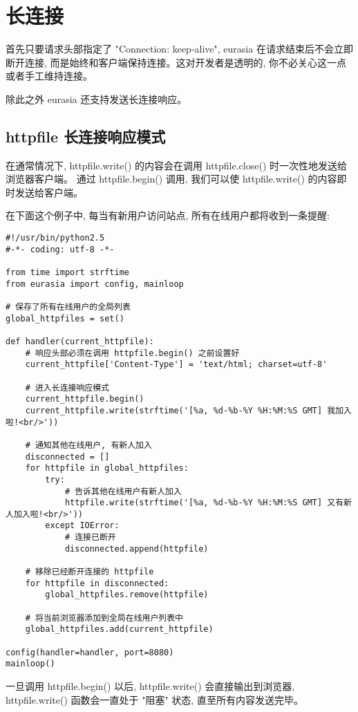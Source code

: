 \documentclass{manual}
\begin{document}
\section{长连接}

首先只要请求头部指定了 "Connection: keep-alive", eurasia 在请求结束后不会立即断开连接,
而是始终和客户端保持连接。这对开发者是透明的, 你不必关心这一点或者手工维持连接。

除此之外 eurasia 还支持发送长连接响应。

\subsection{httpfile 长连接响应模式}

在通常情况下, httpfile.write() 的内容会在调用 httpfile.close() 时一次性地发送给浏览器客户端。
通过 httpfile.begin() 调用, 我们可以使 httpfile.write() 的内容即时发送给客户端。

在下面这个例子中, 每当有新用户访问站点, 所有在线用户都将收到一条提醒:

\begin{verbatim}
#!/usr/bin/python2.5
#-*- coding: utf-8 -*-

from time import strftime
from eurasia import config, mainloop

# 保存了所有在线用户的全局列表
global_httpfiles = set()

def handler(current_httpfile):
	# 响应头部必须在调用 httpfile.begin() 之前设置好
	current_httpfile['Content-Type'] = 'text/html; charset=utf-8'

	# 进入长连接响应模式
	current_httpfile.begin()
	current_httpfile.write(strftime('[%a, %d-%b-%Y %H:%M:%S GMT] 我加入啦!<br/>'))

	# 通知其他在线用户, 有新人加入
	disconnected = []
	for httpfile in global_httpfiles:
		try:
			# 告诉其他在线用户有新人加入
			httpfile.write(strftime('[%a, %d-%b-%Y %H:%M:%S GMT] 又有新人加入啦!<br/>'))
		except IOError:
			# 连接已断开
			disconnected.append(httpfile)

	# 移除已经断开连接的 httpfile
	for httpfile in disconnected:
		global_httpfiles.remove(httpfile)

	# 将当前浏览器添加到全局在线用户列表中
	global_httpfiles.add(current_httpfile)

config(handler=handler, port=8080)
mainloop()
\end{verbatim}

一旦调用 httpfile.begin() 以后, httpfile.write() 会直接输出到浏览器,
httpfile.write() 函数会一直处于 "阻塞" 状态, 直至所有内容发送完毕。
\end{document}
